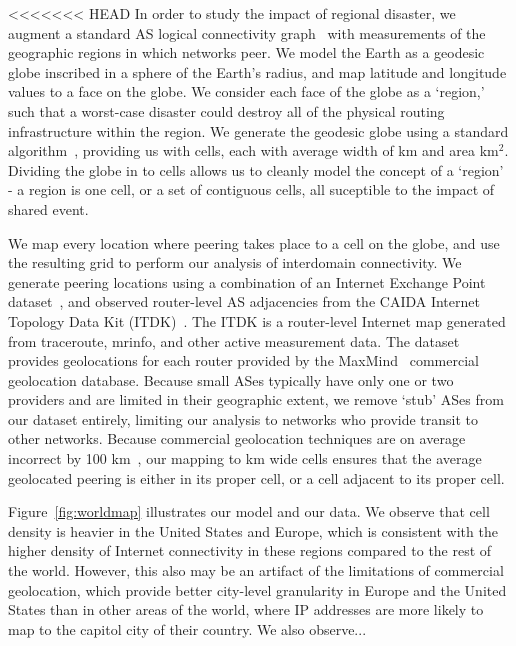 <<<<<<< HEAD
    In order to study the impact of regional disaster, we augment a standard AS logical connectivity graph~\cite{caida-asgraph} with measurements of the geographic regions in which networks peer.
    We model the Earth as a geodesic globe inscribed in a sphere of the Earth's radius, and map latitude and longitude values to a face on the globe.
    We consider each face of the globe as a `region,' such that a worst-case disaster could destroy all of the physical routing infrastructure within the region.
    We generate the geodesic globe using a standard algorithm~\cite{geodesic}, providing us with   cells, each with average width of km and area  km$^2$.  
    Dividing the globe in to cells allows us to cleanly model the concept of a `region' - a region is one cell, or a set of contiguous cells, all suceptible to the impact of shared event. 
     
    We map every location where peering takes place to a cell on the globe, and use the resulting grid to perform our analysis of interdomain connectivity.
    We generate peering locations using a combination of an Internet Exchange Point dataset~\cite{ixps-mapped}, and observed router-level AS adjacencies from the CAIDA Internet Topology Data Kit (ITDK)~\cite{itdk}.
    The ITDK is a router-level Internet map generated from traceroute, mrinfo, and other active measurement data.
    The dataset provides geolocations for each router provided by the MaxMind~\cite{maxmind} commercial geolocation database.
    Because small ASes typically have only one or two providers and are limited in their geographic extent, we remove `stub' ASes from our dataset entirely, limiting our analysis to networks who provide transit to other networks.
    Because commercial geolocation techniques are on average incorrect by 100 km~\cite{someone}, our mapping to  km wide cells ensures that the average geolocated peering is either in its proper cell, or a cell adjacent to its proper cell.
    
    
    Figure~\ref{fig:worldmap} illustrates our model and our data.
    We observe that cell density is heavier in the United States and Europe, which is consistent with the higher density of Internet connectivity in these regions compared to the rest of the world.
    However, this also may be an artifact of the limitations of commercial geolocation, which provide better city-level granularity in Europe and the United States than in other areas of the world, where IP addresses are more likely to map to the capitol city of their country.
    We also observe... 

